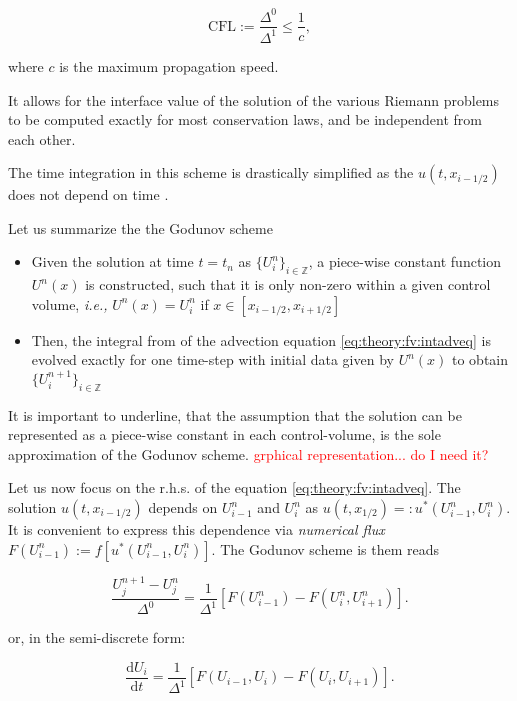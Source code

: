 \begin{equation}
\text{CFL}:=\frac{\Delta^0}{\Delta^1}\leq\frac{1}{c},
\end{equation}

where $c$ is the maximum propagation speed. 

It allows for the interface value of the solution of the various Riemann problems to be computed exactly for most conservation laws, and be independent from each other. 

The time integration in this scheme is drastically simplified as the $u(t, x_{i-1/2})$ does not depend on time \cite{LeVeque:1992}. 

Let us summarize the the Godunov scheme

\begin{itemize}
    \item Given the solution at time $t= t_n$ as $\{U_i ^n\}_{i\in\mathbb{Z}}$, a piece-wise constant function $U^n(x)$ is constructed, such that it is only non-zero within a given control volume, \textit{i.e.,} $U^n(x) = U_i ^n$ if $x\in[x_{i-1/2}, x_{i+1/2}]$
    \item Then, the integral from of the advection equation \ref{eq:theory:fv:intadveq} is evolved exactly for one time-step with initial data given by $U^n(x)$ to obtain $\{U^{n+1}_i\}_{i\in\mathbb{Z}}$ 
\end{itemize}

It is important to underline, that the assumption that the solution can be represented as a piece-wise constant in each control-volume, is the sole approximation of the Godunov scheme. 
\textcolor{red}{grphical representation... do I need it?} 

Let us now focus on the r.h.s. of the equation \ref{eq:theory:fv:intadveq}. 
The solution $u(t, x_{i-1/2})$ depends on $U_{i-1} ^n$ and $U_{i} ^n$ as $u(t, x_{1/2}) =: u^* (U_{i-1}^{n}, U_{i}^n)$. It is convenient to express this dependence via \textit{numerical flux} $F(U_{i-1}^{n}):=f[u^*(U_{i-1}^{n}, U_{i}^{n})]$. The Godunov scheme is them reads

\begin{equation}
\frac{U_{j}^{n+1} - U_{j}^{n}}{\Delta^0} = \frac{1}{\Delta^1}[F(U_{i-1}^{n}) - F(U_{i}^{n}, U_{i+1}^{n})].
\label{eq:theory:fv:discrete}
\end{equation}

or, in the semi-discrete form:

\begin{equation}
\frac{\text{d}U_i}{\text{d} t} = \frac{1}{\Delta^1}[F(U_{i-1}, U_{i}) - F(U_i, U_{i+1})].
\label{eq:theory:fv:semi-discrete}
\end{equation}

